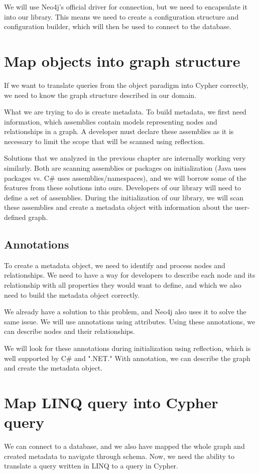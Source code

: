 We will use Neo4j's official driver for connection, but we need to encapsulate it into our library. This means we need to create a configuration structure and configuration builder, which will then be used to connect to the database.

\section {Map objects into graph structure}

If we want to translate queries from the object paradigm into Cypher correctly, we need to know the graph structure described in our domain.

What we are trying to do is create metadata. To build metadata, we first need information, which assemblies contain models representing nodes and relationships in a graph. A developer must declare these assemblies as it is necessary to limit the scope that will be scanned using reflection.

Solutions that we analyzed in the previous chapter are internally working very similarly. Both are scanning assemblies or packages on initialization (Java uses packages vs. C\# uses assemblies/namespaces), and we will borrow some of the features from these solutions into ours. Developers of our library will need to define a set of assemblies. During the initialization of our library, we will scan these assemblies and create a metadata object with information about the user-defined graph.

\subsection {Annotations}

To create a metadata object, we need to identify and process nodes and relationships. We need to have a way for developers to describe each node and its relationship with all properties they would want to define, and which we also need to build the metadata object correctly.

We already have a solution to this problem, and Neo4j also uses it to solve the same issue. We will use annotations using attributes. Using these annotations, we can describe nodes and their relationships.

We will look for these annotations during initialization using reflection, which is well supported by C\# and ".NET." With annotation, we can describe the graph and create the metadata object.

\section {Map LINQ query into Cypher query}

We can connect to a database, and we also have mapped the whole graph and created metadata to navigate through schema. Now, we need the ability to translate a query written in LINQ to a query in Cypher.
